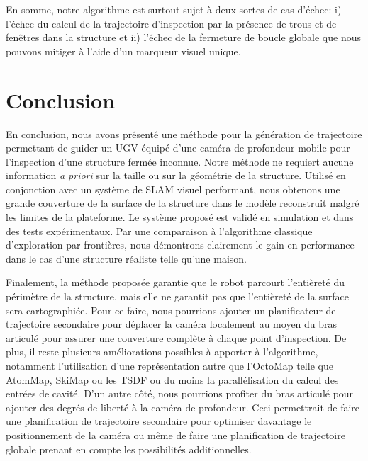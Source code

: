 En somme, notre algorithme est surtout sujet à deux sortes de cas d'échec: i) l'échec du calcul de la trajectoire d'inspection par la présence de trous et de fenêtres dans la structure et ii) l'échec de la fermeture de boucle globale que nous pouvons mitiger à l'aide d'un marqueur visuel unique.

\section{Conclusion} \label{sec:ugv_conclusion}

En conclusion, nous avons présenté une méthode pour la génération de trajectoire permettant de guider un UGV équipé d'une caméra de profondeur mobile pour l'inspection d'une structure fermée inconnue. Notre méthode ne requiert aucune information \textit{a priori} sur la taille ou sur la géométrie de la structure. Utilisé en conjonction avec un système de SLAM visuel performant, nous obtenons une grande couverture de la surface de la structure dans le modèle reconstruit malgré les limites de la plateforme. Le système proposé est validé en simulation et dans des tests expérimentaux. Par une comparaison à l'algorithme classique d'exploration par frontières, nous démontrons clairement le gain en performance dans le cas d'une structure réaliste telle qu'une maison.

Finalement, la méthode proposée garantie que le robot parcourt l'entièreté du périmètre de la structure, mais elle ne garantit pas que l'entièreté de la surface sera cartographiée. Pour ce faire, nous pourrions ajouter un planificateur de trajectoire secondaire pour déplacer la caméra localement au moyen du bras articulé pour assurer une couverture complète à chaque point d'inspection. De plus, il reste plusieurs améliorations possibles à apporter à l'algorithme, notamment l'utilisation d'une représentation autre que l'OctoMap telle que AtomMap, SkiMap ou les TSDF ou du moins la parallélisation du calcul des entrées de cavité. D'un autre côté, nous pourrions profiter du bras articulé pour ajouter des degrés de liberté à la caméra de profondeur. Ceci permettrait de faire une planification de trajectoire secondaire pour optimiser davantage le positionnement de la caméra ou même de faire une planification de trajectoire globale prenant en compte les possibilités additionnelles.
